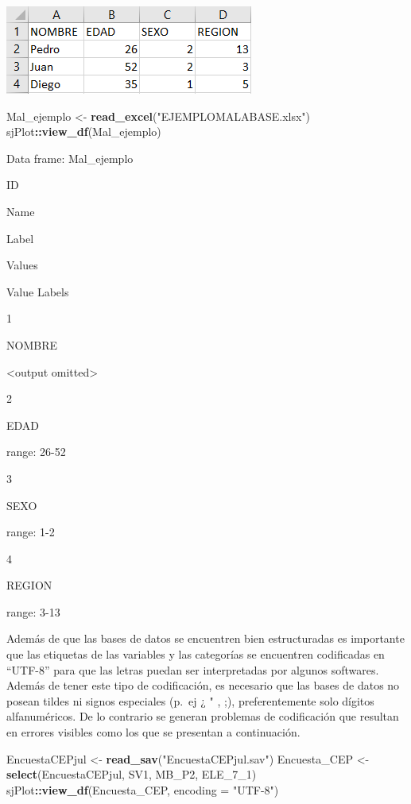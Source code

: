 \documentclass[
  14pt,
]{book}
\newenvironment{Shaded}{\begin{snugshade}}{\end{snugshade}}
\newcommand{\DataTypeTok}[1]{\textcolor[rgb]{0.13,0.29,0.53}{#1}}
\newcommand{\DecValTok}[1]{\textcolor[rgb]{0.00,0.00,0.81}{#1}}
\newcommand{\KeywordTok}[1]{\textcolor[rgb]{0.13,0.29,0.53}{\textbf{#1}}}
\newcommand{\NormalTok}[1]{#1}
\newcommand{\OperatorTok}[1]{\textcolor[rgb]{0.81,0.36,0.00}{\textbf{#1}}}
\newcommand{\StringTok}[1]{\textcolor[rgb]{0.31,0.60,0.02}{#1}}
\begin{document}
\begin{center}\includegraphics[width=0.8\linewidth,]{EJEMPLOMALABASE} \end{center}

\begin{Shaded}
\begin{Highlighting}[]
\NormalTok{Mal_ejemplo <-}\StringTok{ }\KeywordTok{read_excel}\NormalTok{(}\StringTok{"EJEMPLOMALABASE.xlsx"}\NormalTok{)}
\NormalTok{sjPlot}\OperatorTok{::}\KeywordTok{view_df}\NormalTok{(Mal_ejemplo)}
\end{Highlighting}
\end{Shaded}

Data frame: Mal\_ejemplo

ID

Name

Label

Values

Value Labels

1

NOMBRE

\textless output omitted\textgreater{}

2

EDAD

range: 26-52

3

SEXO

range: 1-2

4

REGION

range: 3-13

Además de que las bases de datos se encuentren bien estructuradas es importante que las etiquetas de las variables y las categorías se encuentren codificadas en ``UTF-8'' para que las letras puedan ser interpretadas por algunos softwares. Además de tener este tipo de codificación, es necesario que las bases de datos no posean tildes ni signos especiales (p.~ej ¿ " , ;), preferentemente solo dígitos alfanuméricos. De lo contrario se generan problemas de codificación que resultan en errores visibles como los que se presentan a continuación.

\begin{Shaded}
\begin{Highlighting}[]
\NormalTok{EncuestaCEPjul <-}\StringTok{ }\KeywordTok{read_sav}\NormalTok{(}\StringTok{"EncuestaCEPjul.sav"}\NormalTok{)}
\NormalTok{Encuesta_CEP <-}\StringTok{ }\KeywordTok{select}\NormalTok{(EncuestaCEPjul, SV1, MB_P2, ELE_}\DecValTok{7}\NormalTok{_}\DecValTok{1}\NormalTok{)}
\NormalTok{sjPlot}\OperatorTok{::}\KeywordTok{view_df}\NormalTok{(Encuesta_CEP, }\DataTypeTok{encoding =} \StringTok{"UTF-8"}\NormalTok{)}
\end{Highlighting}
\end{Shaded}
\end{document}
